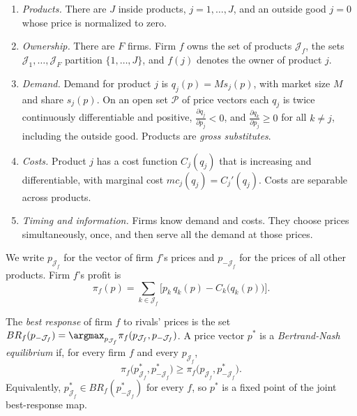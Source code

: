 \begin{assumption}\label{ass:04-bertrand}
\leavevmode
\begin{enumerate}[label=(\alph*)]
  \item \emph{Products.} There are $J$ inside products, $j = 1, \dots, J$, and an outside good $j = 0$ whose price
  is normalized to zero.
  \item \emph{Ownership.} There are $F$ firms. Firm $f$ owns the set of products $\mathcal{J}_f$, the sets
  $\mathcal{J}_1, \dots, \mathcal{J}_F$ partition $\{1, \dots, J\}$, and $f(j)$ denotes the owner of product
  $j$.
  \item \emph{Demand.} Demand for product $j$ is $q_j(p) = M s_j(p)$, with market size $M$ and share $s_j(p)$.
  On an open set $\mathcal{P}$ of price vectors each $q_j$ is twice continuously differentiable and positive,
  $\frac{\partial q_j}{\partial p_j} < 0$, and $\frac{\partial q_k}{\partial p_j} \ge 0$ for all $k \ne j$,
  including the outside good. Products are \emph{gross substitutes}.
  \item \emph{Costs.} Product $j$ has a cost function $C_j(q_j)$ that is increasing and differentiable, with
  marginal cost $mc_j(q_j) = C_j'(q_j)$. Costs are separable across products.
  \item \emph{Timing and information.} Firms know demand and costs. They choose prices simultaneously, once,
  and then serve all the demand at those prices.
\end{enumerate}
\end{assumption}

We write $p_{\mathcal{J}_f}$ for the vector of firm $f$'s prices and $p_{-\mathcal{J}_f}$ for the prices of all
other products. Firm $f$'s profit is
\begin{equation}\label{eq:04-profit}
\pi_f(p) = \sum_{k \in \mathcal{J}_f}\Big[p_k\,q_k(p) - C_k\big(q_k(p)\big)\Big].
\end{equation}

\begin{definition}\label{def:04-bertrand-nash}
The \emph{best response} of firm $f$ to rivals' prices is the set
$BR_f(p_{-\mathcal{J}_f}) = \argmax_{p_{\mathcal{J}_f}}\pi_f(p_{\mathcal{J}_f}, p_{-\mathcal{J}_f})$. A price vector
$p^*$ is a \emph{Bertrand-Nash equilibrium} if, for every firm $f$ and every $p_{\mathcal{J}_f}$,
\begin{equation*}
\pi_f\big(p^*_{\mathcal{J}_f}, p^*_{-\mathcal{J}_f}\big) \ge \pi_f\big(p_{\mathcal{J}_f}, p^*_{-\mathcal{J}_f}\big).
\end{equation*}
Equivalently, $p^*_{\mathcal{J}_f} \in BR_f(p^*_{-\mathcal{J}_f})$ for every $f$, so $p^*$ is a fixed point of
the joint best-response map.
\end{definition}

